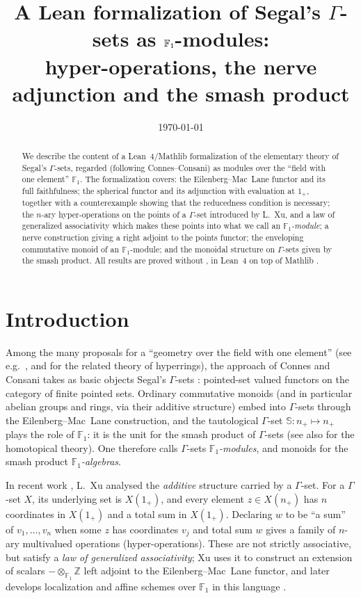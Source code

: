 \documentclass[11pt,a4paper]{amsart}
\title[A Lean formalization of $\Gamma$-sets as $\F$-modules]{A Lean formalization of Segal's $\Gamma$-sets as $\F$-modules:\\
hyper-operations, the nerve adjunction and the smash product}
\date{\today}
\newcommand{\lean}[1]{\texttt{\detokenize{#1}}}
\newcommand{\F}{\mathbb{F}_1}
\newcommand{\Sph}{\mathbb{S}}
\theoremstyle{plain}
\theoremstyle{definition}
\theoremstyle{remark}
\begin{document}
\sloppy

\begin{abstract}
We describe the content of a Lean~4/Mathlib formalization of the elementary theory of Segal's
$\Gamma$-sets, regarded (following Connes--Consani) as modules over the ``field with one
element'' $\F$. The formalization covers: the Eilenberg--Mac~Lane functor and its full
faithfulness; the spherical functor and its adjunction with evaluation at $1_+$, together with a
counterexample showing that the reducedness condition is necessary; the $n$-ary hyper-operations on
the points of a $\Gamma$-set introduced by L.~Xu, and a law of generalized associativity which makes
these points into what we call an \emph{$\F$-module}; a nerve construction giving a right adjoint to
the points functor; the enveloping commutative monoid of an $\F$-module; and the monoidal structure
on $\Gamma$-sets given by the smash product. All results are proved without \lean{sorry}, in Lean~4 \cite{Lean} on top of Mathlib \cite{Mathlib}.
\end{abstract}

\maketitle
\tableofcontents

\section{Introduction}

Among the many proposals for a ``geometry over the field with one element'' (see e.g.\ \cite{De}, and \cite{Ju} for the related theory of hyperrings), the approach of
Connes and Consani \cite{CC1,CC2} takes as basic objects Segal's $\Gamma$-sets \cite{Se}: pointed-set
valued functors on the category of finite pointed sets. Ordinary commutative monoids (and in
particular abelian groups and rings, via their additive structure) embed into $\Gamma$-sets through
the Eilenberg--Mac~Lane construction, and the tautological $\Gamma$-set $\Sph\colon n_+\mapsto n_+$
plays the role of $\F$: it is the unit for the smash product of $\Gamma$-sets \cite{Ly} (see also \cite{BF} for the homotopical theory). One
therefore calls $\Gamma$-sets \emph{$\F$-modules}, and monoids for the smash product
\emph{$\F$-algebras}.

In recent work \cite{X1}, L.~Xu analysed the \emph{additive} structure carried by a $\Gamma$-set.
For a $\Gamma$-set $X$, its underlying set is $X(1_+)$, and every element $z\in X(n_+)$ has $n$
coordinates in $X(1_+)$ and a total sum in $X(1_+)$. Declaring $w$ to be ``a sum'' of
$v_1,\dots,v_n$ when some $z$ has coordinates $v_j$ and total sum $w$ gives a family of $n$-ary
multivalued operations (hyper-operations). These are not strictly associative, but satisfy a
\emph{law of generalized associativity}; Xu uses it to construct an extension of scalars
$-\otimes_{\F}\mathbb{Z}$ left adjoint to the Eilenberg--Mac~Lane functor, and later develops
localization and affine schemes over $\F$ in this language \cite{X2}.
\end{document}
